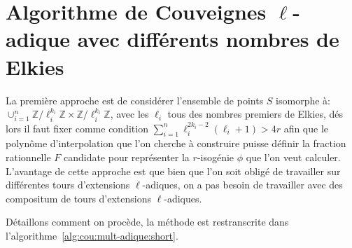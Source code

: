 \documentclass[10pt,a4paper]{book}
\theoremstyle{plain}
\theoremstyle{definition}
\theoremstyle{definition}
\theoremstyle{definition}
\theoremstyle{definition}
\theoremstyle{remark}
\theoremstyle{remark}
\theoremstyle{definition}
\begin{document}
\section{Algorithme de Couveignes $\ell$-adique avec différents nombres de Elkies}
La première approche est de considérer l'ensemble de points $S$ isomorphe à: 
$\cup_{i=1}^n \mathbb{Z}/\ell_i^{k_i} \mathbb{Z} \times \mathbb{Z}/\ell_i^{k_i} \mathbb{Z} $,
avec les $\ell_i$ tous des nombres premiers de Elkies, dés lors il faut fixer comme 
condition  $\sum_{i=1}^n\ell_i^{2k_{i}-2}(\ell_i+1)>4r$
afin que le polynôme d'interpolation que l'on cherche à construire puisse 
définir la fraction rationnelle $F$ candidate pour représenter la $r$-isogénie 
$\phi$ que l'on veut calculer. 
L'avantage de cette approche est que bien que l'on soit obligé de travailler
sur différentes tours d'extensions $\ell$-adiques, on a pas besoin de 
travailler avec des compositum de tours d'extensions $\ell$-adiques.

Détaillons comment on procède, la méthode est restranscrite dans 
l'algorithme~\ref{alg:cou:mult-adique:short}.%
\end{document}

